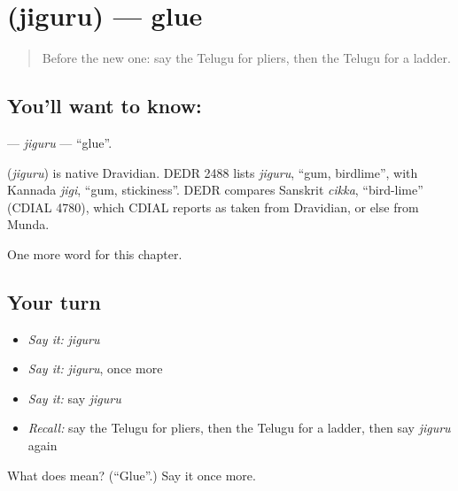 \section[\texorpdfstring{\te{జిగురు} (jiguru)}{జిగురు (jiguru)}]{ (jiguru) — glue}

\label{lesson:TE-C231-jiguru}



\begin{quote}
Before the new one: say the Telugu for pliers, then the Telugu for a ladder.
\end{quote}

\subsection*{You'll want to know: }
\textbf{} — \emph{jiguru} — \textquotedblleft{}glue\textquotedblright{}.

\begin{cousinweb}
\textbf{} (\emph{jiguru}) is native Dravidian. DEDR 2488 lists \emph{jiguru}, \textquotedblleft{}gum, birdlime\textquotedblright{}, with Kannada \emph{jigi}, \textquotedblleft{}gum, stickiness\textquotedblright{}. DEDR compares Sanskrit \emph{cikka}, \textquotedblleft{}bird-lime\textquotedblright{} (CDIAL 4780), which CDIAL reports as taken from Dravidian, or else from Munda.
\end{cousinweb}

\begin{grammarlens}[title={What you've built}]
One more word for this chapter.
\end{grammarlens}

\subsection*{Your turn}
\begin{itemize}
\raggedright
  \item \emph{Say it:} \emph{jiguru}
  \item \emph{Say it:} \emph{jiguru}, once more
  \item \emph{Say it:} say \emph{jiguru}
  \item \emph{Recall:} say the Telugu for pliers, then the Telugu for a ladder, then say \emph{jiguru} again
\end{itemize}

\begin{tcolorbox}[breakable,colback=teal!4,colframe=teal!35!black,title={Before you move on}]
What does  mean? (\textquotedblleft{}Glue\textquotedblright{}.) Say it once more.
\end{tcolorbox}
